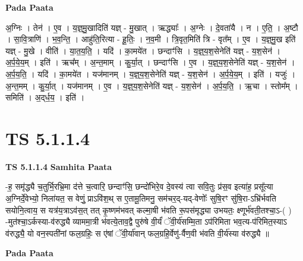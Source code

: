 \documentclass[17pt]{extarticle}
\begin{document}
\textbf{Pada Paata} \newline

अ॒ग्निः । तेन॑ । ए॒व । य॒ज्ञ्॒मु॒खादिति॑ यज्ञ् - मु॒खात् । ऋद्ध्याः᳚ । अ॒ग्नेः । दे॒वता॑यै । न । ए॒ति॒ । अ॒ष्टौ । सा॒वि॒त्राणि॑ । भ॒व॒न्ति॒ । आहु॑ति॒रित्या - हू॒तिः॒ । न॒व॒मी । त्रि॒वृत॒मिति॑ त्रि - वृत᳚म् । ए॒व । य॒ज्ञ्॒मु॒ख इति॑ यज्ञ् - मु॒खे । वीति॑ । या॒त॒य॒ति॒ । यदि॑ । का॒मये॑त । छन्दाꣳ॑सि । य॒ज्ञ्॒य॒श॒सेनेति॑ यज्ञ् - य॒श॒सेन॑ । अ॒र्प॒ये॒य॒म् । इति॑ । ऋच᳚म् । अ॒न्त॒माम् । कु॒र्या॒त् । छन्दाꣳ॑सि । ए॒व । य॒ज्ञ्॒य॒श॒सेनेति॑ यज्ञ् - य॒श॒सेन॑ । अ॒र्प॒य॒ति॒ । यदि॑ । का॒मये॑त । यज॑मानम् । य॒ज्ञ्॒य॒श॒सेनेति॑ यज्ञ् - य॒श॒सेन॑ । अ॒र्प॒ये॒य॒म् । इति॑ । यजुः॑ । अ॒न्त॒मम् । कु॒र्या॒त् । यज॑मानम् । ए॒व । य॒ज्ञ्॒य॒श॒सेनेति॑ यज्ञ् - य॒श॒सेन॑ । अ॒र्प॒य॒ति॒ । ऋ॒चा । स्तोम᳚म् । समिति॑ । अ॒द्‌र्ध॒य॒ । इति॑ ।  \newline





\section{ TS 5.1.1.4 }

\textbf{TS 5.1.1.4 } \newline
\textbf{Samhita Paata} \newline

-ह॒ समृ॑द्ध्यै च॒तुर्भि॒रभ्रि॒मा द॑त्ते च॒त्वारि॒ छन्दाꣳ॑सि॒ छन्दो॑भिरे॒व दे॒वस्य॑ त्वा सवि॒तुः प्र॑स॒व इत्या॑ह॒ प्रसू᳚त्या अ॒ग्निर्दे॒वेभ्यो॒ निला॑यत॒ स वेणुं॒ प्राऽवि॑श॒थ् स ए॒तामू॒तिमनु॒ सम॑चर॒द्-यद्-वेणोः᳚ सुषि॒रꣳ सु॑षि॒रा-ऽभ्रि॑र्भवति सयोनि॒त्वाय॒ स यत्र॑य॒त्राऽव॑स॒त् तत् कृ॒ष्णम॑भवत् कल्मा॒षी भ॑वति रू॒पस॑मृद्ध्या उभयतः॒ क्ष्णूर्भ॑वती॒तश्चा॒ऽ-( ) -मुत॑श्चा॒ऽर्कस्या-व॑रुद्ध्यै व्याममा॒त्री भ॑वत्ये॒ताव॒द्वै पुरु॑षे वी॒र्यं॑ ॅवी॒र्य॑सम्मि॒ता ऽप॑रिमिता भव॒त्य-प॑रिमित॒स्याऽ व॑रुद्ध्यै॒ यो वन॒स्पती॑नां फल॒ग्रहिः॒ स ए॑षां ॅवी॒र्या॑वान् फल॒ग्रहि॒र्वेणु॑-र्वैण॒वी भ॑वति वी॒र्य॑स्या व॑रुद्ध्यै ॥ \newline

\textbf{Pada Paata} \newline
\end{document}
